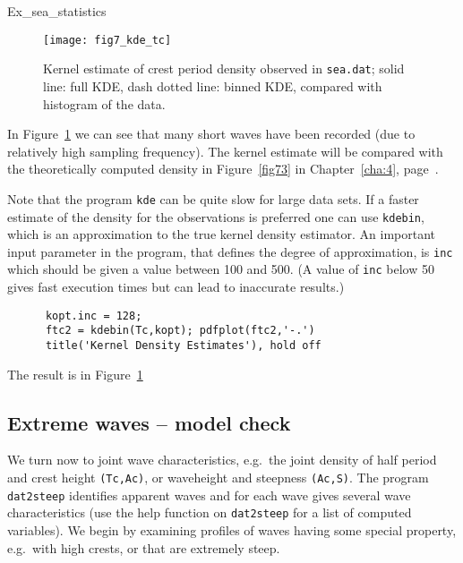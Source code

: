 \begin{cex}{Ex_sea_statistics}
\begin{figure}
\centering
  \texttt{[image: fig7\_kde\_tc]}
\vspace{-3mm}
  \caption[Kernel estimate of the crest period density]{
Kernel estimate of crest period density observed in {\tt sea.dat};
solid line: full KDE, dash dotted line: binned KDE,
compared with histogram of the data.
}
  \label{fig7_kde_tc}
\end{figure}
In Figure~\ref{fig7_kde_tc} we can see that many short
waves have been recorded (due to relatively high sampling frequency).
The kernel estimate will be compared with the theoretically
computed density in Figure~\ref{fig73} in Chapter~\ref{cha:4},
page~\pageref{fig73}.
\end{cex}

\begin{remark} Note that the program {\tt kde}
can be quite slow for large data sets. If a faster estimate of the
density for the observations is preferred one can use
{\tt kdebin},
which is an approximation to the true kernel density estimator. An
important input parameter in the program, that defines the degree of
approximation, is {\tt inc} which should be given a value between 100 and
500. (A value of {\tt inc} below 50 gives fast execution times
but can lead to inaccurate results.)
{\small\begin{verbatim}
      kopt.inc = 128;
      ftc2 = kdebin(Tc,kopt); pdfplot(ftc2,'-.')
      title('Kernel Density Estimates'), hold off
\end{verbatim}}
\noindent The result is in
Figure~\ref{fig7_kde_tc}  
\end{remark}

\subsection{Extreme waves -- model check}
We turn now to joint wave characteristics, e.g.\ the joint density of
half period and crest height {\tt (Tc,Ac)}, or waveheight and steepness
{\tt (Ac,S)}. The program {\tt dat2steep} identifies apparent waves and 
for each wave gives several wave characteristics
(use the help function on {\tt dat2steep} for
a list of computed variables). 
We begin by examining profiles of waves having some special property,
e.g.\ with high crests, or that are extremely steep.

